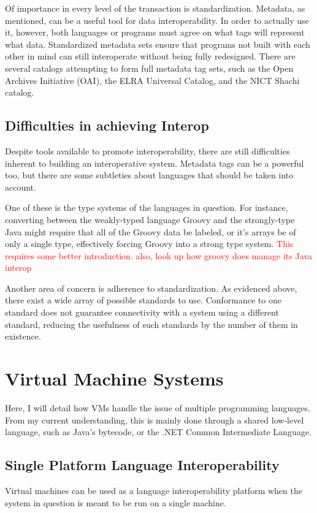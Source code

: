 \documentclass{sig-alternate}
\newcommand{\mycomment}[1]{\textcolor{red}{#1}}
\begin{document}
Of importance in every level of the transaction is standardization. Metadata, as mentioned, can be a useful tool for data interoperability. In order to actually use it, however, both languages or programs must agree on what tags will represent what data. Standardized metadata sets ensure that programs not built with each other in mind can still interoperate without being fully redesigned. There are several catalogs attempting to form full metadata tag sets, such as the Open Archives Initiative (OAI), the ELRA Universal Catalog, and the NICT Shachi catalog.\cite{Ide:2010}

\subsection*{Difficulties in achieving Interop}
Despite tools available to promote interoperability, there are still difficulties inherent to building an interoperative system. Metadata tags can be a powerful too, but there are some subtleties about languages that should be taken into account.

One of these is the type systems of the languages in question. For instance, converting between the weakly-typed language Groovy and the strongly-type Java might require that all of the Groovy data be labeled, or it's arrays be of only a single type, effectively forcing Groovy into a strong type system. \mycomment{This requires some better introduction. also, look up how groovy does manage its Java interop}

Another area of concern is adherence to standardization.
As evidenced above, there exist a wide array of possible standards to use. Conformance to one standard does not guarantee connectivity with a system using a different standard, reducing the usefulness of such standards by the number of them in existence.\cite{?}



\section{Virtual Machine Systems}\label{VM}
Here, I will detail how VMs handle the issue of multiple programming languages.
From my current understanding, this is mainly done through a shared low-level language, such as Java's bytecode, or the .NET Common Intermediate Language.

\subsection*{Single Platform Language Interoperability}
Virtual machines can be used as a language interoperability platform when the system in question is meant to be run on a single machine. 
\end{document}
